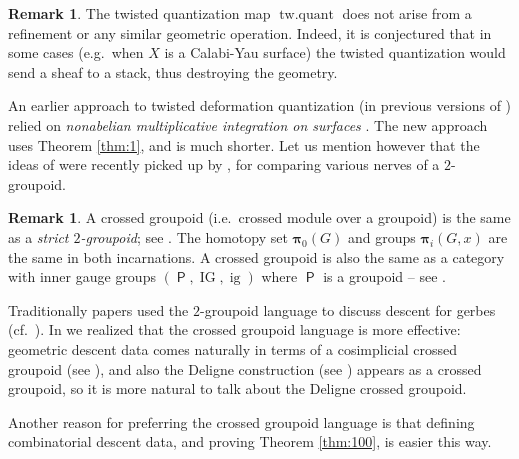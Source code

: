 \documentclass[a4paper,10pt]{amsart}
\theoremstyle{definition}
\newtheorem{rem}[equation]{Remark}
\numberwithin{equation}{section}
\newcommand{\opn}{\operatorname}
\newcommand{\cat}[1]{\operatorname{\mathsf{#1}}}
\newcommand{\bsym}[1]{\boldsymbol{#1}}
\begin{document}
\begin{rem}
The twisted quantization map $\opn{tw{.}quant}$ does not arise from a
refinement or any similar geometric operation. Indeed, it is conjectured that in
some cases (e.g.\ when $X$ is a Calabi-Yau surface) the twisted quantization 
would send a sheaf to a stack, thus destroying the geometry. 

An earlier approach to twisted deformation quantization (in previous versions
of \cite{Ye1}) relied on {\em nonabelian multiplicative integration on
surfaces} \cite{Ye6}. The new approach uses Theorem \ref{thm:1}, and is
much shorter. Let us mention however that the ideas of \cite{Ye6} were recently
picked up by \cite{BGNT2}, for comparing various nerves of a $2$-groupoid. 
\end{rem}

\begin{rem} \label{rem:11}
A crossed groupoid (i.e.\ crossed module over a groupoid) is the same as a {\em
strict $2$-groupoid}; see \cite[Proposition 5.5]{Ye2}. The homotopy set
$\bsym{\pi}_0(G)$ and 
groups $\bsym{\pi}_i(G, x)$ are the same in both incarnations.
A crossed groupoid  is also the same as a 
category with inner gauge groups $(\cat{P}, \opn{IG}, \opn{ig})$ where
$\cat{P}$ is a groupoid -- see \cite[Section 5 and Proposition 10.4]{Ye1}. 

Traditionally papers used the $2$-groupoid language to discuss descent for
gerbes (cf.\ \cite{BGNT1}). In \cite{Ye1} we realized that the crossed groupoid
language is more effective: geometric descent data comes naturally in terms of a
cosimplicial crossed groupoid (see \cite[Section 10]{Ye1}), and also the Deligne
construction (see \cite[Section 6]{Ye2}) appears as a crossed groupoid, so it is
more natural to talk about the Deligne crossed groupoid. 

Another reason for preferring the crossed groupoid language is that defining
combinatorial descent data, and proving Theorem \ref{thm:100}, is easier this
way.
\end{rem}
\end{document}
